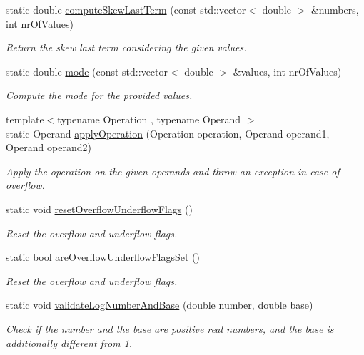 \begin{DoxyCompactItemize}
static double \hyperlink{classmultiscale_1_1Numeric_ac62cbaf1b9aaceae09909a99fd3e7c55}{compute\-Skew\-Last\-Term} (const std\-::vector$<$ double $>$ \&numbers, int nr\-Of\-Values)
\begin{DoxyCompactList}\small\item\em \-Return the skew last term considering the given values. \end{DoxyCompactList}\item 
static double \hyperlink{classmultiscale_1_1Numeric_a34de887efd74a0b761ce8e4cd7bf6f82}{mode} (const std\-::vector$<$ double $>$ \&values, int nr\-Of\-Values)
\begin{DoxyCompactList}\small\item\em \-Compute the mode for the provided values. \end{DoxyCompactList}\item 
{\footnotesize template$<$typename Operation , typename Operand $>$ }\\static \-Operand \hyperlink{classmultiscale_1_1Numeric_a6fe5731e0a4b2728bd4827b564102eb3}{apply\-Operation} (\-Operation operation, \-Operand operand1, \-Operand operand2)
\begin{DoxyCompactList}\small\item\em \-Apply the operation on the given operands and throw an exception in case of overflow. \end{DoxyCompactList}\item 
static void \hyperlink{classmultiscale_1_1Numeric_a5b2a0b5b4aaf837d3d6cc8c3d41d445b}{reset\-Overflow\-Underflow\-Flags} ()
\begin{DoxyCompactList}\small\item\em \-Reset the overflow and underflow flags. \end{DoxyCompactList}\item 
static bool \hyperlink{classmultiscale_1_1Numeric_a096d5367722cb8571ece2bfdb800cea5}{are\-Overflow\-Underflow\-Flags\-Set} ()
\begin{DoxyCompactList}\small\item\em \-Reset the overflow and underflow flags. \end{DoxyCompactList}\item 
static void \hyperlink{classmultiscale_1_1Numeric_a552ccfdcef70918e416191eecaa94481}{validate\-Log\-Number\-And\-Base} (double number, double base)
\begin{DoxyCompactList}\small\item\em \-Check if the number and the base are positive real numbers, and the base is additionally different from 1. \end{DoxyCompactList}\item 

\end{DoxyCompactItemize}
